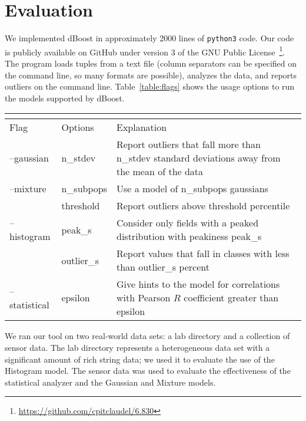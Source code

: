 \section{Evaluation}
\label{sec:evaluation}

We implemented dBoost in approximately 2000 lines of \texttt{python3} code.
Our code is publicly available on GitHub under version 3 of the GNU Public License~\footnote{\url{https://github.com/cpitclaudel/6.830}}.
The program loads tuples from a text file (column separators can be specified on the command line, so many formats are possible), analyzes the data, and reports outliers on the command line.
Table~\ref{table:flags} shows the usage options to run the models supported by dBoost.

\begin{table*}
  \renewcommand{\arraystretch}{1.2}
  \setlength\tabcolsep{3\tabcolsep}

\label{table:flags}
\caption{dBoost command line usage.}
\centering
\begin{tabular} { l | l | p{10cm} }
\multicolumn{3}{l}{} \\
\hline
Flag & Options & Explanation \\
\hline
--gaussian & n\_stdev & Report outliers that fall more than n\_stdev standard deviations away from the mean of the data \\
--mixture & n\_subpops & Use a model of n\_subpops gaussians \\
  & threshold & Report outliers above threshold percentile \\
--histogram & peak\_s & Consider only fields with a peaked distribution with peakiness peak\_s \\
  & outlier\_s & Report values that fall in classes with less than outlier\_s percent \\
--statistical & epsilon & Give hints to the model for correlations with Pearson $R$ coefficient greater than epsilon \\
\end{tabular}
\end{table*}

We ran our tool on two real-world data sets: a lab directory and a collection of sensor data. The lab directory represents a heterogeneous data set with a significant amount of rich string data; we used it to evaluate the use of the Histogram model. The sensor data was used to evaluate the effectiveness of the statistical analyzer and the Gaussian and Mixture models.



%
%

